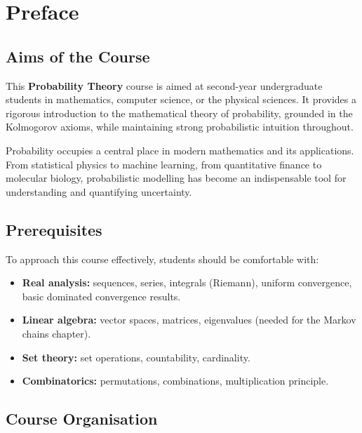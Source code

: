 \chapter*{Preface}

\section*{Aims of the Course}

This \textbf{Probability Theory} course is aimed at second-year undergraduate students
in mathematics, computer science, or the physical sciences. It provides a rigorous
introduction to the mathematical theory of probability, grounded in the Kolmogorov
axioms, while maintaining strong probabilistic intuition throughout.

\medskip

Probability occupies a central place in modern mathematics and its applications.
From statistical physics to machine learning, from quantitative finance to molecular
biology, probabilistic modelling has become an indispensable tool for understanding
and quantifying uncertainty.

\section*{Prerequisites}

To approach this course effectively, students should be comfortable with:
\begin{itemize}
    \item \textbf{Real analysis:} sequences, series, integrals (Riemann), uniform
          convergence, basic dominated convergence results.
    \item \textbf{Linear algebra:} vector spaces, matrices, eigenvalues
          (needed for the Markov chains chapter).
    \item \textbf{Set theory:} set operations, countability, cardinality.
    \item \textbf{Combinatorics:} permutations, combinations, multiplication principle.
\end{itemize}

\section*{Course Organisation}

